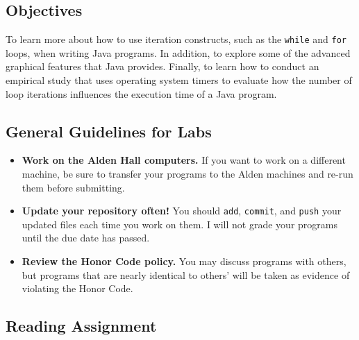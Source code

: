 



\vspace{-0.2in}
\subsection*{Objectives}
\vspace{-0.05in}

To learn more about how to use iteration constructs, such as the {\tt while} and {\tt for} loops, when writing Java
programs. In addition, to explore some of the advanced graphical features that Java provides. Finally, to learn how to
conduct an empirical study that uses operating system timers to evaluate how the number of loop iterations influences
the execution time of a Java program.

\vspace{-0.15in}
\subsection*{General Guidelines for Labs}
\vspace{-0.05in}

\begin{itemize}

\item {\bf Work on the Alden Hall computers.} If you want to work on a different machine, be sure to transfer your
  programs to the Alden machines and re-run them before submitting.

\item {\bf Update your repository often!} You should {\tt add}, {\tt commit}, and {\tt push} your updated files each
  time you work on them.  I will not grade your programs until the due date has passed.

\item {\bf Review the Honor Code policy.} You may discuss programs with others, but programs that are nearly identical
  to others' will be taken as evidence of violating the Honor Code.

\end{itemize}

\vspace{-0.25in}
\subsection*{Reading Assignment}
\vspace{-0.05in}


